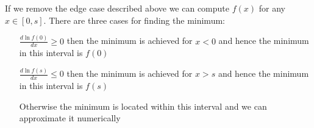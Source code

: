 If we remove the edge case described above we can compute $f(x)$ for any $x \in [0, s]$.
There are three cases for finding the minimum:
\begin{itemize}
	\item[$\frac{d\ln f(0)}{dx} \geq 0$] then the minimum is achieved for $x<0$ and hence the minimum in this interval is $f(0)$
	\item[$\frac{d\ln f(s)}{dx} \leq 0$] then the minimum is achieved for $x>s$ and hence the minimum in this interval is $f(s)$
	\item[Otherwise] the minimum is located within this interval and we can approximate it numerically
\end{itemize}